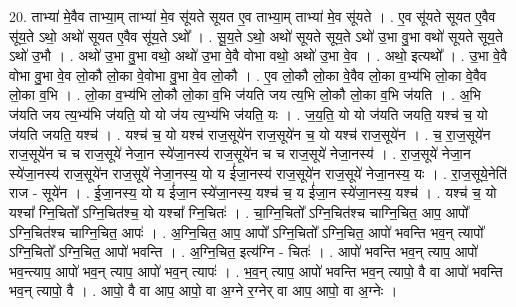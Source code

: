 \documentclass[17pt]{extarticle}
\begin{document}
20. ताभ्या॑ मे॒वैव ताभ्या॒म् ताभ्या॑ मे॒व सू॑यते सूयत ए॒व ताभ्या॒म् ताभ्या॑ मे॒व सू॑यते । . ए॒व सू॑यते सूयत ए॒वैव सू॑य॒ते ऽथो॒ अथो॑ सूयत ए॒वैव सू॑य॒ते ऽथो᳚ । . सू॒य॒ते ऽथो॒ अथो॑ सूयते सूय॒ते ऽथो॑ उ॒भा वु॒भा वथो॑ सूयते सूय॒ते ऽथो॑ उ॒भौ । . अथो॑ उ॒भा वु॒भा वथो॒ अथो॑ उ॒भा वे॒वै वोभा वथो॒ अथो॑ उ॒भा वे॒व । . अथो॒ इत्यथो᳚ । . उ॒भा वे॒वै वोभा वु॒भा वे॒व लो॒कौ लो॒का वे॒वोभा वु॒भा वे॒व लो॒कौ । . ए॒व लो॒कौ लो॒का वे॒वैव लो॒का व॒भ्य॑भि लो॒का वे॒वैव लो॒का व॒भि । . लो॒का व॒भ्य॑भि लो॒कौ लो॒का व॒भि ज॑यति जय त्य॒भि लो॒कौ लो॒का व॒भि ज॑यति । . अ॒भि ज॑यति जय त्य॒भ्य॑भि ज॑यति॒ यो यो ज॑य त्य॒भ्य॑भि ज॑यति॒ यः । . ज॒य॒ति॒ यो यो ज॑यति जयति॒ यश्च॑ च॒ यो ज॑यति जयति॒ यश्च॑ । . यश्च॑ च॒ यो यश्च॑ राज॒सूये॑न राज॒सूये॑न च॒ यो यश्च॑ राज॒सूये॑न । . च॒ रा॒ज॒सूये॑न राज॒सूये॑न च च राज॒सूये॑ नेजा॒न स्ये॑जा॒नस्य॑ राज॒सूये॑न च च राज॒सूये॑ नेजा॒नस्य॑ । . रा॒ज॒सूये॑ नेजा॒न स्ये॑जा॒नस्य॑ राज॒सूये॑न राज॒सूये॑ नेजा॒नस्य॒ यो य ई॑जा॒नस्य॑ राज॒सूये॑न राज॒सूये॑
नेजा॒नस्य॒ यः । . रा॒ज॒सूये॒नेति॑ राज - सूये॑न । . ई॒जा॒नस्य॒ यो य ई॑जा॒न स्ये॑जा॒नस्य॒ यश्च॑ च॒ य ई॑जा॒न स्ये॑जा॒नस्य॒ यश्च॑ । . यश्च॑ च॒ यो यश्चा᳚ ग्नि॒चितो᳚ ऽग्नि॒चित॑श्च॒ यो यश्चा᳚ ग्नि॒चितः॑ । . चा॒ग्नि॒चितो᳚ ऽग्नि॒चित॑श्च चाग्नि॒चित॒ आप॒ आपो᳚ ऽग्नि॒चित॑श्च चाग्नि॒चित॒ आपः॑ । . अ॒ग्नि॒चित॒ आप॒ आपो᳚ ऽग्नि॒चितो᳚ ऽग्नि॒चित॒ आपो॑ भवन्ति भव॒न् त्यापो᳚ ऽग्नि॒चितो᳚ ऽग्नि॒चित॒ आपो॑ भवन्ति । . अ॒ग्नि॒चित॒ इत्य॑ग्नि - चितः॑ । . आपो॑ भवन्ति भव॒न् त्याप॒ आपो॑ भव॒न्त्याप॒ आपो॑ भव॒न् त्याप॒ आपो॑ भव॒न् त्यापः॑ । . भ॒व॒न् त्याप॒ आपो॑ भवन्ति भव॒न् त्यापो॒ वै वा आपो॑ भवन्ति भव॒न् त्यापो॒ वै । . आपो॒ वै वा आप॒ आपो॒ वा अ॒ग्ने र॒ग्नेर् वा आप॒ आपो॒ वा अ॒ग्नेः । \newline
\end{document}
